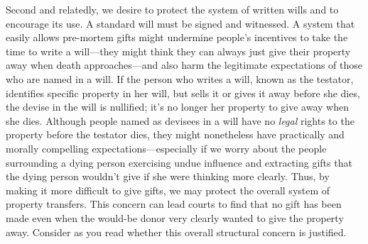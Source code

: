 Second and relatedly, we desire to protect the system of written wills and to
encourage its use. A standard will must be signed and witnessed.  A system that
easily allows pre-mortem gifts might undermine people's incentives to take the
time to write a will---they might think they can always just give their
property away when death approaches---and also harm the legitimate
expectations of those who are named in a will. If the person who writes a will,
known as the testator, identifies specific property in her will, but sells it
or gives it away before she dies, the devise in the will is nullified; it's no
longer her property to give away when she dies.  Although people named as
devisees in a will have no \textit{legal} rights to the property before the
testator dies, they might nonetheless have practically and morally compelling
expectations---especially if we worry about the people surrounding a dying
person exercising undue influence and extracting gifts that the dying person
wouldn't give if she were thinking more clearly.  Thus, by making it more
difficult to give gifts, we may protect the overall system of property
transfers. This concern can lead courts to find that no gift has been made even
when the would-be donor very clearly wanted to give the property away. 
Consider as you read whether this overall structural concern is justified.

